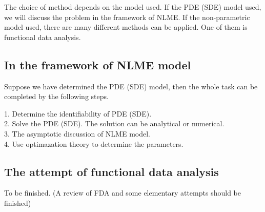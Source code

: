 \documentclass[12pt]{extarticle}
\begin{document}
The choice of method depends on the model used. If the PDE (SDE) model used, we will discuss the problem in the framework of NLME. If the non-parametric model used, there are many different methods can be applied. One of them is functional data analysis.

\subsection{In the framework of NLME model}

Suppose we have determined the PDE (SDE) model, then the whole task can be completed by the following steps.

1. Determine the identifiability of PDE (SDE). \\
2. Solve the PDE (SDE). The solution can be analytical or numerical. \\
3. The asymptotic discussion of NLME model. \\
4. Use optimazation theory to determine the parameters. \\

\subsection{The attempt of functional data analysis}

To be finished. (A review of FDA and some elementary attempts should be finished)
\end{document}
